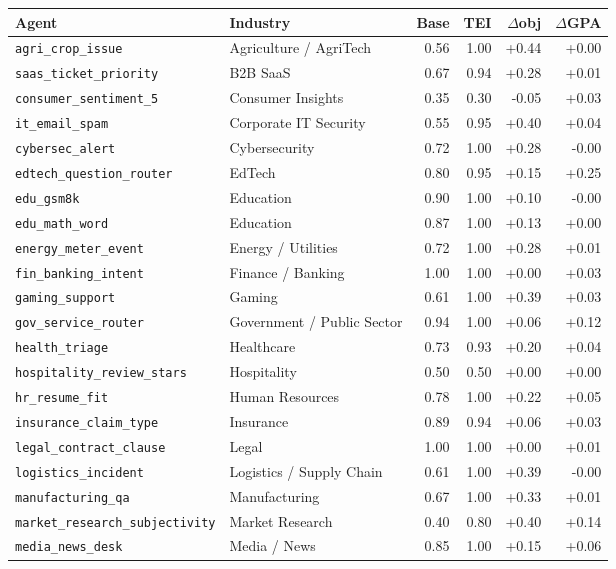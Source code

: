 \begin{tabular}{llrrrr}
\toprule
Agent & Industry & Base & TEI & $\Delta$obj & $\Delta$GPA \\
\midrule
\texttt{agri\_crop\_issue} & Agriculture / AgriTech & 0.56 & 1.00 & +0.44 & +0.00 \\
\texttt{saas\_ticket\_priority} & B2B SaaS & 0.67 & 0.94 & +0.28 & +0.01 \\
\texttt{consumer\_sentiment\_5} & Consumer Insights & 0.35 & 0.30 & -0.05 & +0.03 \\
\texttt{it\_email\_spam} & Corporate IT Security & 0.55 & 0.95 & +0.40 & +0.04 \\
\texttt{cybersec\_alert} & Cybersecurity & 0.72 & 1.00 & +0.28 & -0.00 \\
\texttt{edtech\_question\_router} & EdTech & 0.80 & 0.95 & +0.15 & +0.25 \\
\texttt{edu\_gsm8k} & Education & 0.90 & 1.00 & +0.10 & -0.00 \\
\texttt{edu\_math\_word} & Education & 0.87 & 1.00 & +0.13 & +0.00 \\
\texttt{energy\_meter\_event} & Energy / Utilities & 0.72 & 1.00 & +0.28 & +0.01 \\
\texttt{fin\_banking\_intent} & Finance / Banking & 1.00 & 1.00 & +0.00 & +0.03 \\
\texttt{gaming\_support} & Gaming & 0.61 & 1.00 & +0.39 & +0.03 \\
\texttt{gov\_service\_router} & Government / Public Sector & 0.94 & 1.00 & +0.06 & +0.12 \\
\texttt{health\_triage} & Healthcare & 0.73 & 0.93 & +0.20 & +0.04 \\
\texttt{hospitality\_review\_stars} & Hospitality & 0.50 & 0.50 & +0.00 & +0.00 \\
\texttt{hr\_resume\_fit} & Human Resources & 0.78 & 1.00 & +0.22 & +0.05 \\
\texttt{insurance\_claim\_type} & Insurance & 0.89 & 0.94 & +0.06 & +0.03 \\
\texttt{legal\_contract\_clause} & Legal & 1.00 & 1.00 & +0.00 & +0.01 \\
\texttt{logistics\_incident} & Logistics / Supply Chain & 0.61 & 1.00 & +0.39 & -0.00 \\
\texttt{manufacturing\_qa} & Manufacturing & 0.67 & 1.00 & +0.33 & +0.01 \\
\texttt{market\_research\_subjectivity} & Market Research & 0.40 & 0.80 & +0.40 & +0.14 \\
\texttt{media\_news\_desk} & Media / News & 0.85 & 1.00 & +0.15 & +0.06 \\

\end{tabular}
